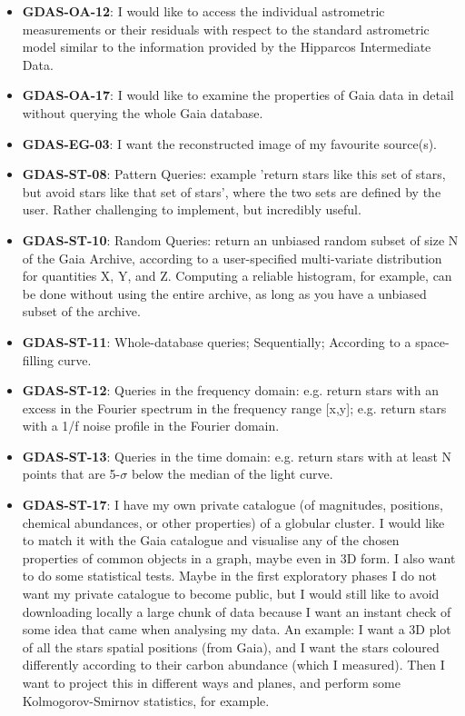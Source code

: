 \documentclass[longauth, final]{aa}
\begin{document}
\begin{itemize}
\item{\bf GDAS-OA-12}: I would like to access the individual astrometric measurements or their residuals with respect to the standard astrometric model similar to the information provided by the  Hipparcos Intermediate Data.

\item{\bf GDAS-OA-17}: I would like to examine the properties of Gaia data in detail without querying the whole Gaia database. 

\item{\bf GDAS-EG-03}: I want the reconstructed image of my favourite source(s). 

\item{\bf GDAS-ST-08}: Pattern Queries: example 'return stars like this set of stars, but avoid stars like that set of stars', where the two sets are defined by the user. Rather challenging to implement, but incredibly useful.

\item{\bf GDAS-ST-10}: Random Queries: return an unbiased random subset of size N of the Gaia Archive, according to a user-specified multi-variate distribution for quantities X, Y, and Z. Computing a reliable histogram, for example, can be done without using the entire archive, as long as you have a unbiased subset of the archive. 

\item{\bf GDAS-ST-11}: Whole-database queries; Sequentially; According to a space-filling curve.

\item{\bf GDAS-ST-12}: Queries in the frequency domain: e.g. return stars with an excess in the Fourier spectrum in the frequency range [x,y]; e.g. return stars with a 1/f noise profile in the Fourier domain.

\item{\bf GDAS-ST-13}: Queries in the time domain: e.g. return stars with at least N points that are 5-$\sigma$ below the median of the light curve. 

\item{\bf GDAS-ST-17}: I have my own private catalogue (of magnitudes, positions, chemical abundances, or other properties) of a globular cluster. I would like to match it with the Gaia catalogue and visualise any of the chosen properties of common objects in a graph, maybe even in 3D form. I also want to do some statistical tests. Maybe in the first exploratory phases I do not want my private catalogue to become public, but I would still like to avoid downloading locally a large chunk of data because I want an instant check of some idea that came when analysing my data. An example: I want a 3D plot of all the stars spatial positions (from Gaia), and I want the stars coloured differently according to their carbon abundance (which I measured). Then I want to project this in different ways and planes, and perform some Kolmogorov-Smirnov statistics, for example.


\end{itemize}
\end{document}
